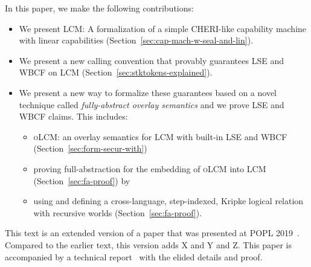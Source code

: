 \documentclass[acmsmall,screen]{acmart}\settopmatter{}
\newcommand{\trgcm}{\textsc{LCM}}
\newcommand{\srccm}{\textsc{oLCM}}
\newenvironment{jversion}%
    {\color{OliveGreen}}{}
\begin{document}
In this paper, we make the following contributions:
\begin{itemize}
\item We present \trgcm{}: A formalization of a simple CHERI-like capability machine with linear capabilities (Section~\ref{sec:cap-mach-w-seal-and-lin}).
\item We present a new calling convention \stktokens{} that provably guarantees LSE and WBCF on \trgcm{} (Section~\ref{sec:stktokens-explained}).
\item We present a new way to formalize these guarantees based on a novel
  technique called \textit{fully-abstract overlay semantics} and we prove LSE
  and WBCF claims. This includes:
  \begin{itemize}
  \item \srccm{}: an overlay semantics for \trgcm{} with built-in LSE and WBCF (Section~\ref{sec:form-secur-with})
  \item proving full-abstraction for the embedding of \srccm{} into \trgcm{} (Section~\ref{sec:fa-proof}) by
  \item using and defining a cross-language, step-indexed, Kripke logical relation with recursive worlds (Section~\ref{sec:fa-proof}).
  \end{itemize}
\end{itemize}

\begin{jversion}
  This text is an extended version of a paper that was presented at POPL 2019~\citep{skorstengaard_stktokens_2019}.
  Compared to the earlier text, this version adds X and Y and Z.
  This paper is accompanied by a technical report~\citep{technical_report_popl} with the elided details and proof.
\end{jversion}

\end{document}
